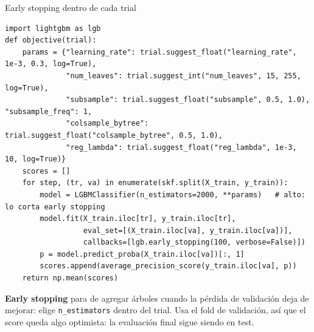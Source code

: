 \documentclass[aspectratio=169,12pt]{beamer}
\begin{document}
\begin{frame}[fragile]{Early stopping dentro de cada trial}
\begin{lstlisting}[basicstyle=\ttfamily\scriptsize,columns=fullflexible,keepspaces=true,xleftmargin=12pt]
import lightgbm as lgb
def objective(trial):
    params = {"learning_rate": trial.suggest_float("learning_rate", 1e-3, 0.3, log=True),
              "num_leaves": trial.suggest_int("num_leaves", 15, 255, log=True),
              "subsample": trial.suggest_float("subsample", 0.5, 1.0), "subsample_freq": 1,
              "colsample_bytree": trial.suggest_float("colsample_bytree", 0.5, 1.0),
              "reg_lambda": trial.suggest_float("reg_lambda", 1e-3, 10, log=True)}
    scores = []
    for step, (tr, va) in enumerate(skf.split(X_train, y_train)):
        model = LGBMClassifier(n_estimators=2000, **params)   # alto: lo corta early stopping
        model.fit(X_train.iloc[tr], y_train.iloc[tr],
                  eval_set=[(X_train.iloc[va], y_train.iloc[va])],
                  callbacks=[lgb.early_stopping(100, verbose=False)])
        p = model.predict_proba(X_train.iloc[va])[:, 1]
        scores.append(average_precision_score(y_train.iloc[va], p))
    return np.mean(scores)
\end{lstlisting}
  \footnotesize\textbf{Early stopping} para de agregar árboles cuando la pérdida de validación deja de mejorar: elige \texttt{n\_estimators} dentro del trial. Usa el fold de validación, así que el score queda algo optimista: la evaluación final sigue siendo en test.
\end{frame}
\end{document}
